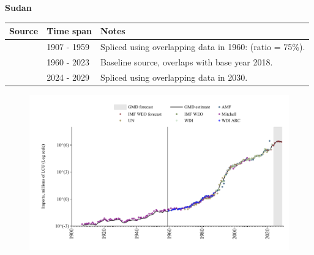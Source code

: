 \documentclass[12pt,a4paper,landscape]{article}
\begin{document}
\begin{adjustbox}{max totalsize={\paperwidth}{\paperheight},center}
\begin{minipage}[t][\textheight][t]{\textwidth}
\vspace*{0.5cm}
{}
\begin{center}
{\Large\bfseries Sudan}
\end{center}
\vspace{0.5cm}
\begin{table}[H]
\centering
\small
\begin{tabular}{|l|l|l|}
\hline
\textbf{Source} & \textbf{Time span} & \textbf{Notes} \\
\hline
\rowcolor{white}\cite{Mitchell}& 1907 - 1959 &Spliced using overlapping data in 1960: (ratio = 75\%).\\
\rowcolor{lightgray}\cite{WDI}& 1960 - 2023 &Baseline source, overlaps with base year 2018.\\
\rowcolor{white}\cite{IMF_WEO_forecast}& 2024 - 2029 &Spliced using overlapping data in 2030.\\
\hline
\end{tabular}
\end{table}
\begin{figure}[H]
\centering
\includegraphics[width=\textwidth,height=0.6\textheight,keepaspectratio]{graphs/SDN_imports.pdf}
\end{figure}
\end{minipage}
\end{adjustbox}
\end{document}
